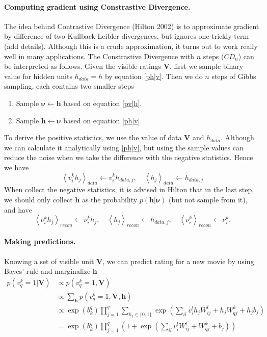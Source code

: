 \documentclass[bj, preprint]{imsart}
\newcommand{\cexp}[1]{\left<#1\right>}
\begin{document}
\paragraph{Computing gradient using Constrastive Divergence.}\label{par:method.models.rbm.grad}

The idea behind Contrastive Divergence (Hilton 2002) is to approximate gradient by difference of two Kullback-Leibler divergences, but ignores one trickly term (add details). Although this is a crude approximation, it turns out to work really well in many applications. The Constrastive Divergence with $n$ steps ($CD_n$) can be interpreted as follows. Given the visible ratings $\textbf{V}$, first we sample binary value for hidden units $h_{data} = h$ by equation \eqref{ph|v}. Then we do $n$ steps of Gibbs sampling, each contains two smaller steps
\begin{enumerate}
	\item Sample $\boldsymbol{\nu} \leftarrow \boldsymbol{h}$ based on equation \eqref{pv|h}.
	\item Sample $\boldsymbol{h} \leftarrow \boldsymbol{\nu}$ based on equation \eqref{ph|v}.
\end{enumerate}
To derive the positive statistics, we use the value of data $\textbf{V}$ and $h_{data}$. Although we can calculate it analytically using \eqref{ph|v}, but using the sample values can reduce the noise when we take the difference with the negative statistics. Hence we have
$$\cexp{v_i^k h_j}_{data} \leftarrow v_i^k h_{data, j}, \quad \cexp{h_j}_{data} \leftarrow h_{data, j}$$
When collect the negative statistics, it is advised in Hilton that in the last step, we should only collect $\boldsymbol{h}$ as the probability $p(\textbf{h}|\boldsymbol{\nu})$ (but not sample from it), and have     
$$\cexp{\nu_i^k h_j}_{recon} \leftarrow \nu_i^k h_{j},\quad \cexp{h_j}_{recon} \leftarrow h_{data, j},\quad \cexp{\nu_i^k}_{recon} \leftarrow \nu_i^k.$$

\paragraph{Making predictions.}\label{par:method.models.rbm.pred}

Knowing a set of visible unit $\textbf{V}$, we can predict rating for a new movie by using Bayes' rule and marginalize $\textbf{h}$
\begin{align*}
p(v_q^{k} =  1 |\textbf{V}) & \propto p(v_q^{k} = 1, \textbf{V})  \\
&  \propto \sum_{\textbf{h}} p(v_q^{k} = 1, \textbf{V}, \textbf{h})\\
& \propto \exp(b_k^q) \prod_{j=1}^{q} \sum_{h_j\in \{0,1\}} \exp(\sum_{il} v_i^{l} h_j W_{ij}^{l} + h_j W_{qj}^{k} + h_jb_j)\\
& = \exp(b_k^q) \prod_{j=1}^{q} \left( 1 +  \exp(\sum_{il} v_i^{l} W_{ij}^{l} +  W_{qj}^{k} + b_j)\right)
\end{align*}
\end{document}
